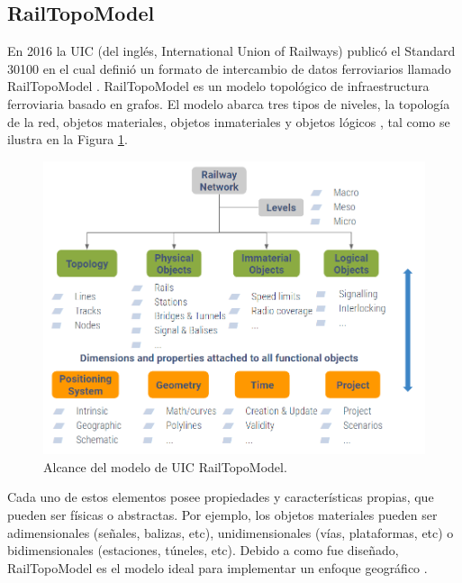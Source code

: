 \subsection{RailTopoModel}

    En 2016 la UIC (del inglés, International Union of Railways) publicó el Standard 30100 \cite{Paper_146} en el cual definió un formato de intercambio de datos ferroviarios llamado RailTopoModel \cite{Paper_144}. RailTopoModel es un modelo topológico de infraestructura ferroviaria basado en grafos. El modelo abarca tres tipos de niveles, la topología de la red, objetos materiales, objetos inmateriales y objetos lógicos \cite{Paper_143}, tal como se ilustra en la Figura \ref{fig:RTM_3}. 

    \begin{figure}[!h]
        \centering
        \includegraphics[width=1\textwidth]{Figuras/objetos}
        \centering\caption{Alcance del modelo de UIC RailTopoModel.}
        \label{fig:RTM_3}
    \end{figure}

    Cada uno de estos elementos posee propiedades y características propias, que pueden ser físicas o abstractas. Por ejemplo, los objetos materiales pueden ser adimensionales (señales, balizas, etc), unidimensionales (vías, plataformas, etc) o bidimensionales (estaciones, túneles, etc). Debido a como fue diseñado, RailTopoModel es el modelo ideal para implementar un enfoque geográfico \cite{Paper_103}.
    




